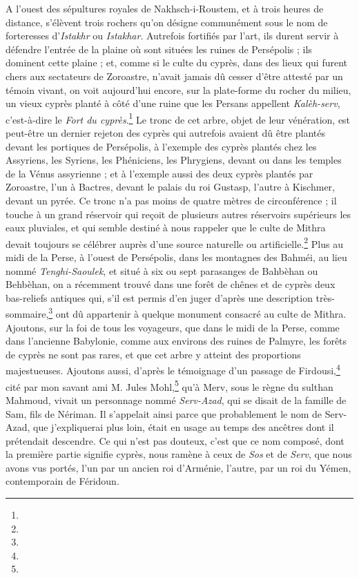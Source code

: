 \documentclass[a4paper, 11pt, oneside, polutonikogreek, french]{article}
\begin{document}
A l'ouest des sépultures royales de Nakhsch-i-Roustem, et à trois heures de distance, s'élèvent trois rochers qu'on désigne communément sous le nom de forteresses d'\emph{Istakhr} ou \emph{Istakhar}. Autrefois fortifiés par l'art, ils durent servir à défendre l'entrée de la plaine où sont situées les ruines de Persépolis ; ils dominent cette plaine ; et, comme si le culte du cyprès, dans des lieux qui furent chers aux sectateurs de Zoroastre, n'avait jamais dû cesser d'être attesté par un témoin vivant, on voit aujourd'hui encore, sur la plate-forme du rocher du milieu, un vieux cyprès planté à côté d'une ruine que les Persans appellent \emph{Kalèh-serv}, c'est-à-dire le \emph{Fort du cyprès}.\footnote{} Le tronc de cet arbre, objet de leur vénération, est peut-être un dernier rejeton des cyprès qui autrefois avaient dû être plantés devant les portiques de Persépolis, à l'exemple des cyprès plantés chez les Assyriens, les Syriens, les Phéniciens, les Phrygiens, devant ou dans les temples de la Vénus assyrienne ; et à l'exemple aussi des deux cyprès plantés par Zoroastre, l'un à Bactres, devant le palais du roi Gustasp, l'autre à Kischmer, devant un pyrée. Ce tronc n'a pas moins de quatre mètres de circonférence ; il touche à un grand réservoir qui reçoit de plusieurs autres réservoirs supérieurs les eaux pluviales, et qui semble destiné à nous rappeler que le culte de Mithra devait toujours se célébrer auprès d'une source naturelle ou artificielle.\footnote{} Plus au midi de la Perse, à l'ouest de Persépolis, dans les montagnes des Bahméi, au lieu nommé \emph{Tenghi-Saoulek}, et situé à six ou sept parasanges de Bahbèhan ou Behbèhan, on a récemment trouvé dans une forêt de chênes et de cyprès deux bas-reliefs antiques qui, s'il est permis d'en juger d'après une description très-sommaire,\footnote{} ont dû appartenir à quelque monument consacré au culte de Mithra. Ajoutons, sur la foi de tous les voyageurs, que dans le midi de la Perse, comme dans l'ancienne Babylonie, comme aux environs des ruines de Palmyre, les forêts de cyprès ne sont pas rares, et que cet arbre y atteint des proportions majestueuses. Ajoutons aussi, d'après le témoignage d'un passage de Firdousi,\footnote{} cité par mon savant ami M. Jules Mohl,\footnote{} qu'à Merv, sous le règne du sulthan Mahmoud, vivait un personnage nommé \emph{Serv-Azad}, qui se disait de la famille de Sam, fils de Nériman. Il s'appelait ainsi parce que probablement le nom de Serv-Azad, que j'expliquerai plus loin, était en usage au temps des ancêtres dont il prétendait descendre. Ce qui n'est pas douteux, c'est que ce nom composé, dont la première partie signifie cyprès, nous ramène à ceux de \emph{Sos} et de \emph{Serv}, que nous avons vus portés, l'un par un ancien roi d'Arménie, l'autre, par un roi du Yémen, contemporain de Féridoun.
\end{document}
